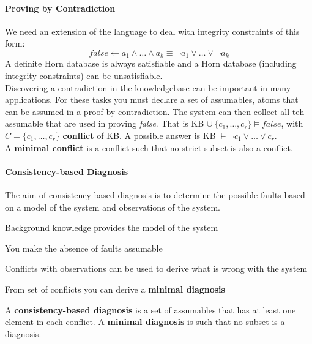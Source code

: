 \documentclass[10pt]{report}
\begin{document}
\paragraph{Proving by Contradiction} We need an extension of the language to deal with integrity constraints of this form: $$false \leftarrow a_1\wedge\ldots\wedge a_k \equiv \neg a_1\vee\ldots\vee\neg a_k$$
A definite Horn database is always satisfiable and a Horn database (including integrity constraints) can be unsatisfiable.\\
Discovering a contradiction in the knowledgebase can be important in many applications. For these tasks you must declare a set of assumables, atoms that can be assumed in a proof by contradiction. The system can then collect all teh assumable that are used in proving \textit{false}. That is KB $\cup\:\{c_1,\ldots,c_r\}\vDash false$, with $C=\{c_1,\ldots,c_r\}$ \textbf{conflict} of KB. A possible answer is KB $\vDash \neg c_1\vee\ldots\vee c_r$.\\
A \textbf{minimal conflict} is a conflict such that no strict subset is also a conflict.
\paragraph{Consistency-based Diagnosis} The aim of consistency-based diagnosis is to determine the possible faults based on a model of the system and observations of the system.\begin{list}{}{}
	\item Background knowledge provides the model of the system
	\item You make the absence of faults assumable
	\item Conflicts with observations can be used to derive what is wrong with the system
	\item From set of conflicts you can derive a \textbf{minimal diagnosis}
\end{list}
A \textbf{consistency-based diagnosis} is a set of assumables that has at least one element in each conflict. A \textbf{minimal diagnosis} is such that no subset is a diagnosis.
\end{document}
